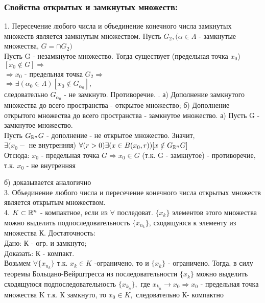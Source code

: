 \subsubsection{Свойства открытых и замкнутых множеств:}
1. Пересечение любого числа и объединение конечного числа замкнутых множеств является замкнутым множеством.
\dokvo
Пусть $G_2,(\alpha\in\Lambda$ - замкнутые множества, $G=\cap G_2)$
\\
Пусть G - незамкнутое множество. Тогда существует (предельная точка $x_0$)$[x_0\notin G] \Rightarrow$
\\
$\Rightarrow x_0$ - предельная точка $G_2\Rightarrow$
\\
$\Rightarrow \exists(\alpha_0\in\Lambda)[x_0\notin G_{\alpha_0}],$
\\
следовательно $G_{\alpha_0}$ - не замкнуто.
Противоречие.
. а) Дополнение замкнутого множества до всего 		пространства - открытое множество;
   б) Дополнение открытого множества до всего пространства - замкнутое множество.
\dokvo
а) Пусть G - замкнутое множество.
\\
Пусть $G_{\mathbb{R}^n}G$ - дополнение - не открытое множество. Значит,
\\
$\exists(x_0 - $ не внутренняя) $\forall(r>0)\exists(x\in B(x_0,r))[x\notin G_{\mathbb{R}^n}G]$
\\
Отсюда: $x_0$ - предельная точка $G\Rightarrow x_0\in G$ (т.к. G - замкнутое) - противоречие, т.к. $x_0$ - не внутренняя
\dokno

б) доказывается аналогично
\\
3. Объединение  любого числа и пересечение конечного числа открытых множеств является открытым множеством.
\\
4. $K\subset\mathbb{R}^n$ - компактное, если из $\forall$ последоват. $\{x_k\}$ элементов этого множества можно выделить подпоследовательность $\{x_{n_k}\}$, сходящуюся к элементу из множества К.
\dokvo
Достаточность:
\\
Дано: К - огр. и замкнуто;
\\
Доказать: К - компакт.
\\
Возьмем $\forall\{x_{n_k}\}$ т.к. $x_k\in K$ -ограничено, то и $\{x_k\}$ - ограничено. Тогда, в силу теоремы Больцано-Вейрштресса из последовательности $\{x_k\}$ можно выделить сходящуюся подпоследовательность $\{x_{k_n}\},$ где $x_{k_n}\to x_0\Rightarrow x_0$ - предельная точка множества K т.к. К замкнуто, то $x_0\in K,$ следовательно К- компактно
\dokno




